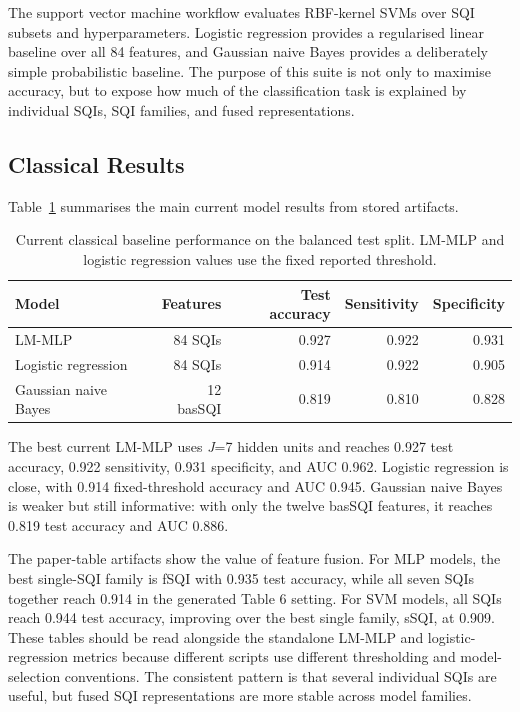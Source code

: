 \documentclass[11pt,a4paper]{article}
\begin{document}
The support vector machine workflow evaluates RBF-kernel SVMs over SQI subsets and hyperparameters. Logistic regression provides a regularised linear baseline over all 84 features, and Gaussian naive Bayes provides a deliberately simple probabilistic baseline. The purpose of this suite is not only to maximise accuracy, but to expose how much of the classification task is explained by individual SQIs, SQI families, and fused representations.

\subsection{Classical Results}

Table~\ref{tab:classical-main} summarises the main current model results from stored artifacts.

\begin{table}[h]
\centering
\begin{tabular}{lrrrr}
\toprule
Model & Features & Test accuracy & Sensitivity & Specificity \\
\midrule
LM-MLP & 84 SQIs & 0.927 & 0.922 & 0.931 \\
Logistic regression & 84 SQIs & 0.914 & 0.922 & 0.905 \\
Gaussian naive Bayes & 12 basSQI & 0.819 & 0.810 & 0.828 \\
\bottomrule
\end{tabular}
\caption{Current classical baseline performance on the balanced test split. LM-MLP and logistic regression values use the fixed reported threshold.}
\label{tab:classical-main}
\end{table}

The best current LM-MLP uses \textit{J}=7 hidden units and reaches 0.927 test accuracy, 0.922 sensitivity, 0.931 specificity, and AUC 0.962. Logistic regression is close, with 0.914 fixed-threshold accuracy and AUC 0.945. Gaussian naive Bayes is weaker but still informative: with only the twelve basSQI features, it reaches 0.819 test accuracy and AUC 0.886.

The paper-table artifacts show the value of feature fusion. For MLP models, the best single-SQI family is fSQI with 0.935 test accuracy, while all seven SQIs together reach 0.914 in the generated Table 6 setting. For SVM models, all SQIs reach 0.944 test accuracy, improving over the best single family, sSQI, at 0.909. These tables should be read alongside the standalone LM-MLP and logistic-regression metrics because different scripts use different thresholding and model-selection conventions. The consistent pattern is that several individual SQIs are useful, but fused SQI representations are more stable across model families.
\end{document}

